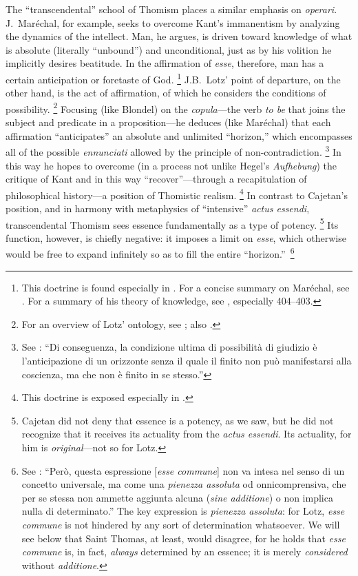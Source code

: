 The ``transcendental'' school of Thomism places a similar emphasis on \emph{operari}. J.~Maréchal, for example, seeks to overcome Kant's immanentism by analyzing the dynamics of the intellect. Man, he argues, is driven toward knowledge of what is absolute (literally ``unbound'') and unconditional, just as by his volition he implicitly desires beatitude. In the affirmation of \emph{esse}, therefore, man has a certain anticipation or foretaste of God.%
%
\footnote{This doctrine is found especially in \cite{marechal:cahier05}. For a concise summary on Maréchal, see \cite[265--269]{copleston:history:09}. For a summary of his theory of knowledge, see \cite{daros:apriori}, especially 404--403. }
%
J.B.~Lotz' point of departure, on the other hand, is the act of affirmation, of which he considers the conditions of possibility.%
%
\footnote{For an overview of Lotz' ontology, see \cite[116--119]{contat:quarta-via}; also \cite[216--229]{contat:confronto}.}
%
Focusing (like Blondel) on the \emph{copula}---the verb \emph{to be} that joins the subject and predicate in a proposition---he deduces (like Maréchal) that each affirmation ``anticipates'' an absolute and unlimited ``horizon,'' which encompasses all of the possible \emph{ennunciati} allowed by the principle of non-contradiction.%
%
\footnote{See \cite[117--118]{contat:quarta-via}: ``Di conseguenza, la condizione ultima di possibilità di giudizio è l'anticipazione di un orizzonte senza il quale il finito non può manifestarsi alla coscienza, ma che non è finito in se stesso.''}
%
In this way he hopes to overcome (in a process not unlike Hegel's \emph{Aufhebung}) the critique of Kant and in this way ``recover''---through a recapitulation of philosophical history---a position of Thomistic realism.%
%
\footnote{This doctrine is exposed especially in \cite{lotz:esperienza}.}
%
In contrast to Cajetan's position, and in harmony with metaphysics of ``intensive'' \emph{actus essendi}, transcendental Thomism sees essence fundamentally as a type of potency.%
%
\footnote{Cajetan did not deny that essence is a potency, as we saw, but he did not recognize that it receives its actuality from the \emph{actus essendi}. Its actuality, for him is \emph{original}—not so for Lotz.}
%
Its function, however, is chiefly negative: it imposes a limit on \emph{esse}, which otherwise would be free to expand infinitely so as to fill the entire ``horizon.''\,%
%
\footnote{See \cite[104--105]{lotz:esperienza}: ``Però, questa espressione [\emph{esse commune}] non va intesa nel senso di un concetto universale, ma come una \emph{pienezza assoluta} od onnicomprensiva, che per se stessa non ammette aggiunta alcuna (\emph{sine additione}) o non implica nulla di determinato.'' The key expression is \emph{pienezza assoluta}: for Lotz, \emph{esse commune} is not hindered by any sort of determination whatsoever. We will see below that Saint Thomas, at least, would disagree, for he holds that \emph{esse commune} is, in fact, \emph{always} determined by an essence; it is merely \emph{considered} without \emph{additione}.}
